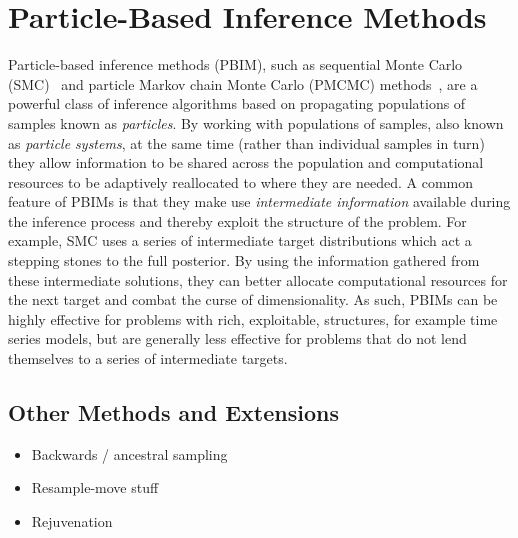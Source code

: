 
\chapter{Particle-Based Inference Methods}
\label{chp:part}

Particle-based inference methods (PBIM), such as sequential Monte Carlo (SMC)~\citep{gordon1993novel,doucet2001introduction} and 
particle Markov chain Monte Carlo (PMCMC) methods~\citep{andrieu2009pseudo,rainforth2016interacting},
are a powerful class of inference algorithms based on propagating populations of samples
known as \emph{particles}.  By working with populations of samples, also known as \emph{particle systems},
 at the same time (rather than individual
samples in turn) they allow information to be shared across the population and computational
resources to be adaptively reallocated to where they are needed.  A common feature of PBIMs is
that they make use \emph{intermediate information} available during the inference process and thereby
exploit the structure of the problem.  For example, SMC uses a series of intermediate target distributions
which act a stepping stones to the full posterior.  By using the information gathered from these intermediate
solutions, they can better allocate computational resources for the next target and combat the curse of
dimensionality.  As such, PBIMs can be highly effective for problems with rich, exploitable, structures, 
for example time series models, but are generally less effective for problems that do not lend themselves
to a series of intermediate targets.






\section{Other Methods and Extensions}

\begin{itemize}
	\item Backwards / ancestral sampling
	\item Resample-move stuff
	\item Rejuvenation
\end{itemize}